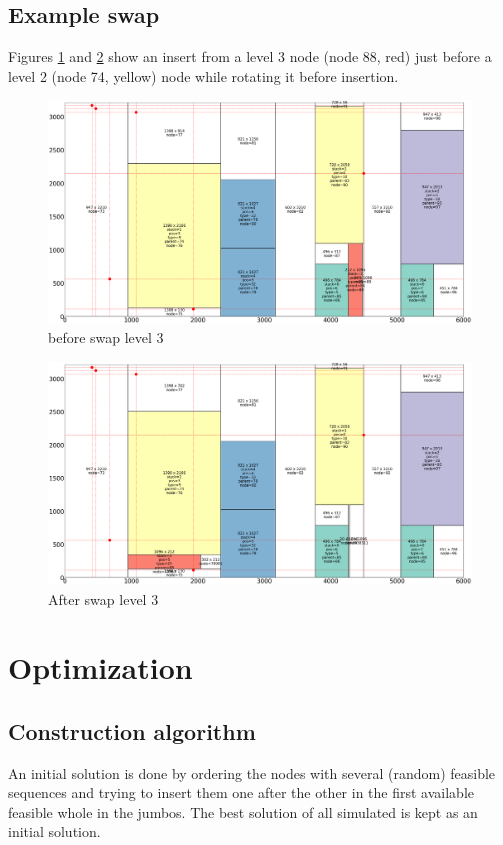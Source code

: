 \documentclass{roadef}
\begin{document}
    \subsection{Example swap}

        Figures \ref{fig:swap3-before} and \ref{fig:swap3-after} show an insert from a level 3 node (node 88, red) just before a level 2 (node 74, yellow) node while rotating it before insertion.

        \begin{figure}
            \centering
            \includegraphics[width=0.4\linewidth]{swap_3_rot_before.png}
            \caption{before swap level 3} \label{fig:swap3-before}
        \end{figure}

        \begin{figure}
            \centering
            \includegraphics[width=0.4\linewidth]{swap_3_rot_after.png}
            \caption{After swap level 3} \label{fig:swap3-after}
        \end{figure}

\section{Optimization}

    \subsection{Construction algorithm}

        An initial solution is done by ordering the nodes with several (random) feasible sequences and trying to insert them one after the other in the first available feasible whole in the jumbos. The best solution of all simulated is kept as an initial solution.

\end{document}
